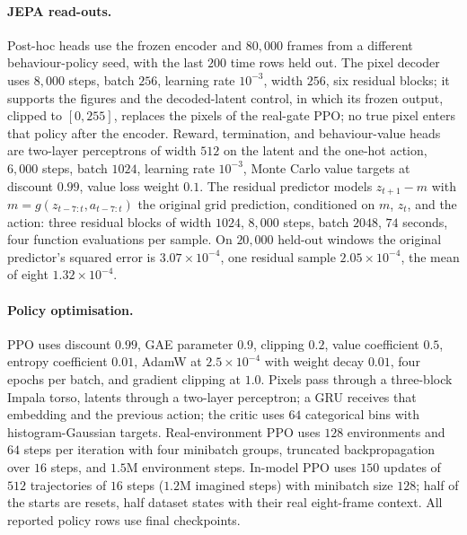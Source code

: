 \paragraph{JEPA read-outs.}
Post-hoc heads use the frozen encoder and $80{,}000$ frames from a different behaviour-policy seed,
with the last $200$ time rows held out. The pixel decoder uses $8{,}000$ steps, batch $256$, learning
rate $10^{-3}$, width $256$, six residual blocks; it supports the figures and the decoded-latent control, in which its frozen output, clipped to $[0,255]$, replaces the pixels of the real-gate PPO; no true pixel enters that policy after the encoder. Reward,
termination, and behaviour-value heads are two-layer perceptrons of width $512$ on the latent and the
one-hot action, $6{,}000$ steps, batch $1024$, learning rate $10^{-3}$, Monte Carlo value targets at
discount $0.99$, value loss weight $0.1$. The residual predictor models $z_{t+1}-m$ with
$m=g(z_{t-7:t},a_{t-7:t})$ the original grid prediction, conditioned on $m$, $z_t$, and the action:
three residual blocks of width $1024$, $8{,}000$ steps, batch $2048$, $74$ seconds, four function
evaluations per sample. On $20{,}000$ held-out windows the original predictor's squared error is
$3.07\times10^{-4}$, one residual sample $2.05\times10^{-4}$, the mean of eight $1.32\times10^{-4}$.

\paragraph{Policy optimisation.}
PPO uses discount $0.99$, GAE parameter $0.9$, clipping $0.2$, value coefficient $0.5$, entropy
coefficient $0.01$, AdamW at $2.5\times10^{-4}$ with weight decay $0.01$, four epochs per batch, and
gradient clipping at $1.0$. Pixels pass through a three-block Impala torso, latents through a two-layer
perceptron; a GRU receives that embedding and the previous action; the critic uses $64$ categorical
bins with histogram-Gaussian targets. Real-environment PPO uses $128$ environments and $64$ steps per
iteration with four minibatch groups, truncated backpropagation over $16$ steps, and $1.5$M
environment steps. In-model PPO uses $150$ updates of $512$ trajectories of $16$ steps ($1.2$M
imagined steps) with minibatch size $128$; half of the starts are resets, half dataset states with
their real eight-frame context. All reported policy rows use final checkpoints.

